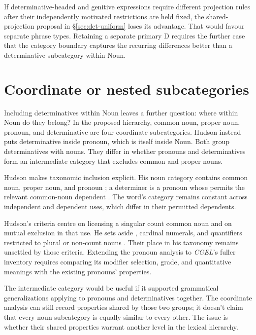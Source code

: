 \documentclass[12pt]{article}
\begin{document}
If determinative-headed and genitive expressions require different projection rules after their independently motivated restrictions are held fixed, the shared-projection proposal in §\ref{sec:det-uniform} loses its advantage. That would favour separate phrase types. Retaining a separate primary D requires the further case that the category boundary captures the recurring differences better than a determinative subcategory within Noun.

\section{Coordinate or nested subcategories}\label{sec:inheritance}

Including determinatives within Noun leaves a further question: where within Noun do they belong? In the proposed hierarchy, common noun, proper noun, pronoun, and determinative are four coordinate subcategories. Hudson instead puts determinative inside pronoun, which is itself inside Noun. Both group determinatives with nouns. They differ in whether pronouns and determinatives form an intermediate category that excludes common and proper nouns.

Hudson makes taxonomic inclusion explicit. His noun category contains common noun, proper noun, and pronoun \citep[253--254]{hudson2010wordgrammar}; a determiner is a pronoun whose  permits the relevant common-noun dependent \citep[9--10]{hudson2004determiners}. The word's category remains constant across independent and dependent uses, which differ in their permitted dependents.

Hudson's criteria centre on licensing a singular count common noun and on mutual exclusion in that use. He sets aside , cardinal numerals, and quantifiers restricted to plural or non-count nouns \citep[9--10]{hudson2004determiners}. Their place in his taxonomy remains unsettled by those criteria. Extending the pronoun analysis to \textit{CGEL}'s fuller inventory requires comparing its modifier selection, grade, and quantitative meanings with the existing pronouns' properties.

The intermediate category would be useful if it supported grammatical generalizations applying to pronouns and determinatives together. The coordinate analysis can still record properties shared by those two groups; it doesn't claim that every noun subcategory is equally similar to every other. The issue is whether their shared properties warrant another level in the lexical hierarchy.
\end{document}
